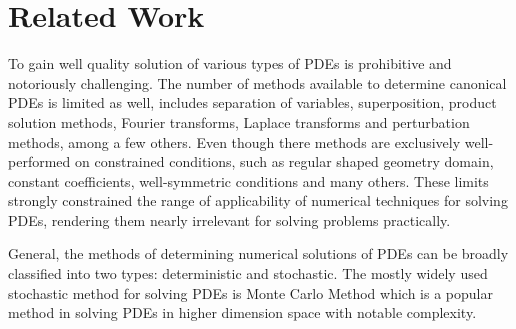 \section{Related Work}

To gain well quality solution of various types of PDEs is prohibitive and notoriously challenging.
The number of methods available to determine canonical PDEs is limited as well,
includes 
separation of variables, 
superposition, 
product solution methods, 
Fourier transforms, 
Laplace transforms and 
perturbation methods, 
among a few others.
Even though there methods are exclusively well-performed on constrained conditions,
such as regular shaped geometry domain, constant coefficients, well-symmetric conditions 
and many others.
These limits strongly constrained the range of applicability of numerical techniques for solving PDEs,
rendering them nearly irrelevant for solving problems practically.

General, the methods of determining numerical solutions of PDEs can be broadly classified into
two types: 
deterministic 
and stochastic. 
The mostly widely used stochastic method for solving PDEs is 
Monte Carlo Method \cite{Monte Carlo Method} which is a popular method in solving PDEs in higher dimension space with 
notable complexity.

